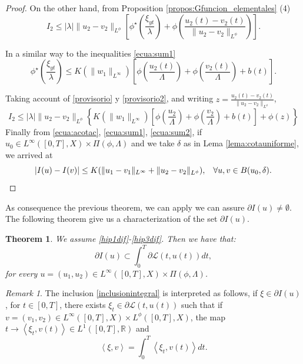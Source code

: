 \documentclass[twoside]{article}
\theoremstyle{definition}
\theoremstyle{plain}
\newtheorem{teo}[definition]{Theorem}
\theoremstyle{remark}
\newtheorem{remark}{Remark}[section]
\begin{document}
\begin{proof}
On the other hand, from Proposition \ref{propos:Gfuncion_elementales} (4)
\begin{equation}\label{provisorio}
I_2\leq
  |\lambda| \|u_2-v_2\|_{L^\phi}  \left[\phi^\star \left( \frac{\xi_{yt}}{\lambda}\right) +\phi \left( \frac{u_2(t)-v_2(t)}{\|u_2-v_2\|_{L^\phi}}\right) \right].
\end{equation}


In a similar way to  the inequalities \eqref{ecua:sum1}
\begin{equation}\label{provisorio2}
\phi^\star \left( \frac{\xi_{yt}}{\lambda}\right)\leq K(\|w_1\|_{L^\infty}) \left [\phi\left( \frac{u_2(t)}{\Lambda} \right)+\phi\left( \frac{v_2(t)}{\Lambda} \right) + b(t)\right].
\end{equation}

Taking account of \eqref{provisorio} y \eqref{provisorio2}, and writing $z=\frac{u_2(t)-v_2(t)}{\|u_2-v_2\|_{L^\phi}}$,
\begin{equation}\label{ecua:sum2}
I_2\leq | \lambda| \|u_2-v_2\|_{L^\phi}
\left\{K(\|w_1\|_{L^\infty}) \left [\phi\left( \frac{u_2}{\Lambda} \right)+\phi\left( \frac{v_2}{\Lambda} \right) + b(t)\right]  + \phi\left( z\right) \right\}
\end{equation}
Finally from \eqref{ecua:acotac}, \eqref{ecua:sum1}, \eqref{ecua:sum2}, if $u_0 \in L^\infty([0,T],X)\times\Pi(\phi, \Lambda)$ and we take $\delta$ as in Lema \ref{lema:cotauniforme}, we arrived at
\[
|I(u)-I(v)|
\leq K(\|u_1-v_1\|_{L^\infty}+\|u_2-v_2\|_{L^\phi}), \hspace{0,3cm} \forall  u,v \in  B(u_0, \delta).
\]
\end{proof}
As consequence the previous theorem, we can apply \cite[Def. 10.3]{clarke2013functional} we can assure $\partial I(u)\neq \emptyset$. The following theorem give us a characterization of the set $\partial I(u)$. 

\begin{teo}\label{teodiff}
We assume \ref{hip1dif}-\ref{hip3dif}. Then we have that:
\begin{equation}\label{inclusionintegral}
    \partial I(u) \subset \int_0^T{\partial \mathcal{L}(t,u(t)) dt,}
\end{equation} 
for every $u=(u_1,u_2) \in L^\infty([0,T],X) \times \Pi(\phi, \Lambda)$.
\end{teo}
\begin{remark}
 The inclusion \eqref{inclusionintegral} is interpreted as follows, if $\xi \in \partial I(u)$, for  $t\in [0,T]$, there exists $\xi_t \in \partial \mathcal{L}(t,u(t))$  such that if $v=(v_1,v_2)\in L^\infty([0,T],X)\times L^\phi([0,T],X) $, the map $t \to \left<\xi_t, v(t)\right> \in L^1([0,T],\mathbb{R})$ and
\[\left<\xi, v\right>=\int_0^T \left<\xi_t , v(t)\right> dt.\]



\end{remark}
\end{document}
